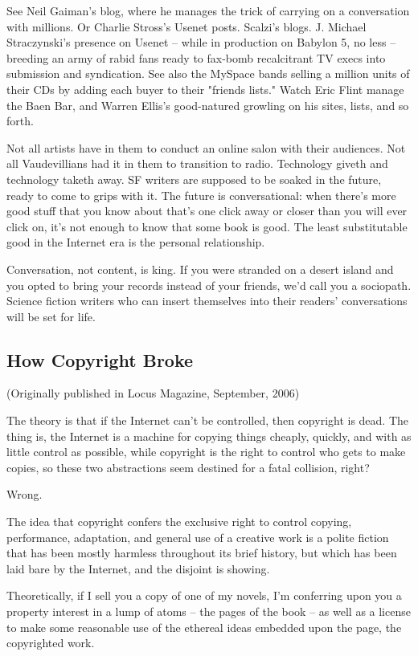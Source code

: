 See Neil Gaiman's blog, where he manages the trick of carrying on a
conversation with millions. Or Charlie Stross's Usenet posts.
Scalzi's blogs. J. Michael Straczynski's presence on Usenet --
while in production on Babylon 5, no less -- breeding an army of
rabid fans ready to fax-bomb recalcitrant TV execs into submission
and syndication. See also the MySpace bands selling a million units
of their CDs by adding each buyer to their "friends lists." Watch
Eric Flint manage the Baen Bar, and Warren Ellis's good-natured
growling on his sites, lists, and so forth.

Not all artists have in them to conduct an online salon with their
audiences. Not all Vaudevillians had it in them to transition to
radio. Technology giveth and technology taketh away. SF writers are
supposed to be soaked in the future, ready to come to grips with
it. The future is conversational: when there's more good stuff that
you know about that's one click away or closer than you will ever
click on, it's not enough to know that some book is good. The least
substitutable good in the Internet era is the personal
relationship.

Conversation, not content, is king. If you were stranded on a
desert island and you opted to bring your records instead of your
friends, we'd call you a sociopath. Science fiction writers who can
insert themselves into their readers' conversations will be set for
life.

\subsection{How Copyright Broke}

(Originally published in Locus Magazine, September, 2006)

The theory is that if the Internet can't be controlled, then
copyright is dead. The thing is, the Internet is a machine for
copying things cheaply, quickly, and with as little control as
possible, while copyright is the right to control who gets to make
copies, so these two abstractions seem destined for a fatal
collision, right?

Wrong.

The idea that copyright confers the exclusive right to control
copying, performance, adaptation, and general use of a creative
work is a polite fiction that has been mostly harmless throughout
its brief history, but which has been laid bare by the Internet,
and the disjoint is showing.

Theoretically, if I sell you a copy of one of my novels, I'm
conferring upon you a property interest in a lump of atoms -- the
pages of the book -- as well as a license to make some reasonable
use of the ethereal ideas embedded upon the page, the copyrighted
work.

